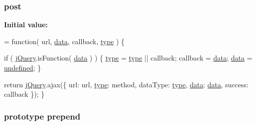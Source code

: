 \hypertarget{jquery-1_810_82-vsdoc_8js_ab2cf0610f8e671450cfe070adfd73a8a}{
\subsubsection[{post}]{ post}}\label{jquery-1_810_82-vsdoc_8js_ab2cf0610f8e671450cfe070adfd73a8a}
{\bfseries Initial value\-:}
\begin{DoxyCode}
= \textcolor{keyword}{function}( url, \hyperlink{jquery-1_810_82-vsdoc_8js_a609407b3456fdc3c5671a9fc4a226ff7}{data}, callback, \hyperlink{jquery-1_810_82-vsdoc_8js_a3940565e83a9bfd10d95ffd27536da91}{type} ) \{


        
        \textcolor{keywordflow}{if} ( \hyperlink{jquery-1_810_82-vsdoc_8js_add5237586d970a38a81f990e8eb28c6c}{jQuery}.isFunction( \hyperlink{jquery-1_810_82-vsdoc_8js_a609407b3456fdc3c5671a9fc4a226ff7}{data} ) ) \{
            \hyperlink{jquery-1_810_82-vsdoc_8js_a3940565e83a9bfd10d95ffd27536da91}{type} = \hyperlink{jquery-1_810_82-vsdoc_8js_a3940565e83a9bfd10d95ffd27536da91}{type} || callback;
            callback = \hyperlink{jquery-1_810_82-vsdoc_8js_a609407b3456fdc3c5671a9fc4a226ff7}{data};
            \hyperlink{jquery-1_810_82-vsdoc_8js_a609407b3456fdc3c5671a9fc4a226ff7}{data} = \hyperlink{jquery-1_810_82-vsdoc_8js_a08113a236cc18d2a9d5ce27e638012be}{undefined};
        \}

        \textcolor{keywordflow}{return} \hyperlink{jquery-1_810_82-vsdoc_8js_add5237586d970a38a81f990e8eb28c6c}{jQuery}.ajax(\{
            url: url,
            \hyperlink{jquery-1_810_82-vsdoc_8js_a3940565e83a9bfd10d95ffd27536da91}{type}: method,
            dataType: \hyperlink{jquery-1_810_82-vsdoc_8js_a3940565e83a9bfd10d95ffd27536da91}{type},
            \hyperlink{jquery-1_810_82-vsdoc_8js_a609407b3456fdc3c5671a9fc4a226ff7}{data}: \hyperlink{jquery-1_810_82-vsdoc_8js_a609407b3456fdc3c5671a9fc4a226ff7}{data},
            success: callback
        \});
    \}
\end{DoxyCode}
\hypertarget{jquery-1_810_82-vsdoc_8js_a2d1a98145e139b1aea1d95967466b151}{
\subsubsection[{prepend}]{ {\bf prototype} prepend}}\label{jquery-1_810_82-vsdoc_8js_a2d1a98145e139b1aea1d95967466b151}
